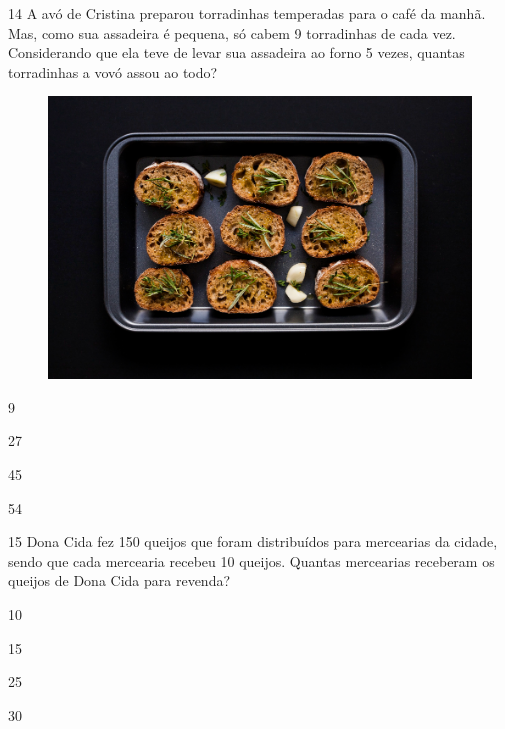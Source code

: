 \num{14} A avó de Cristina preparou torradinhas temperadas para o café da manhã.
Mas, como sua assadeira é pequena, só cabem 9 torradinhas de cada vez.
Considerando que ela teve de levar sua assadeira ao forno 5 vezes,
quantas torradinhas a vovó assou ao todo?

\begin{figure}[H]
\centering
\includegraphics[width=.7\textwidth]{./media/image159.png}
\end{figure}

\begin{escolha}[itemsep=-5pt]
\item 9

\item 27

\item 45

\item 54
\end{escolha}

\num{15} Dona Cida fez 150 queijos que foram distribuídos para mercearias da cidade, sendo que cada mercearia recebeu 10 queijos. Quantas mercearias receberam os queijos de Dona
Cida para revenda?

\begin{escolha}[itemsep=-5pt]
\item 10

\item 15

\item 25

\item 30
\end{escolha}
